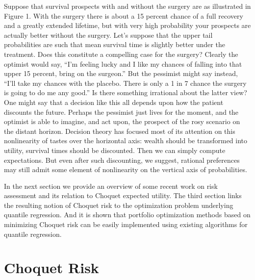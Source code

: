 \documentclass{birkart}
\theoremstyle{definition}
\theoremstyle{remark}
\numberwithin{equation}{section}
\begin{document}
Suppose that survival prospects
with and without the surgery are as illustrated in Figure 1.  With 
the surgery there is about a 15 percent chance of a full recovery
and a greatly extended lifetime, but with very high probability your prospects
are actually better without the surgery.  Let's suppose that the upper 
tail probabilities are such that mean survival time is slightly better under
the treatment.  Does this constitute a compelling case for the surgery?
Clearly the optimist would say, ``I'm feeling lucky and I like my chances
of falling into that upper 15  percent, bring on the surgeon.''
But the pessimist might say instead,
``I'll take my chances with the placebo.  There is
only a 1 in 7 chance the surgery is going to do me any good.'' 
Is there something irrational about the latter view?  One might say
that a decision like this all depends upon how the patient discounts
the future.  Perhaps the pessimist just lives for the moment, and the
optimist is able to imagine, and act upon, the prospect of the
rosy scenario on the distant horizon.  Decision theory has focused most
of its attention on this nonlinearity of tastes over the horizontal
axis:  wealth should be transformed into utility, survival times
should be discounted.  Then we can simply compute expectations.
But even after such discounting, we suggest, rational
preferences may still admit some element of nonlinearity on
the vertical axis of probabilities.  


\vspace{3mm}
In the next section we provide an overview of some recent work on
risk assessment and its relation to Choquet expected utility.
The third section links the resulting notion of Choquet risk to
the optimization problem
underlying quantile regression.  And it is shown that 
portfolio optimization methods based on minimizing Choquet risk
can be easily implemented using existing algorithms for quantile
regression.  

\section{Choquet Risk}
\end{document}
